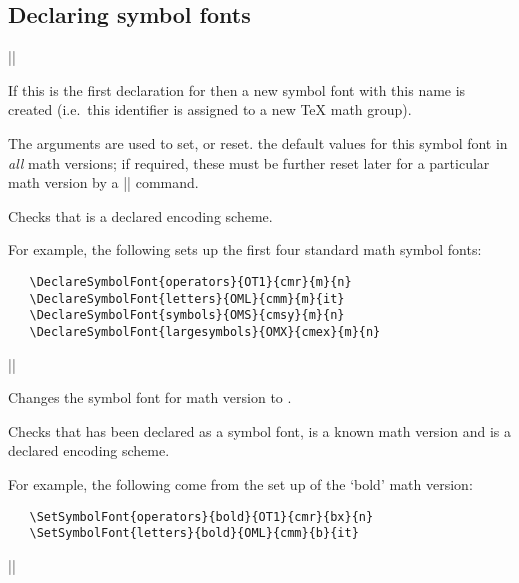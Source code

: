 \documentclass{ltxguide}[1995/11/28]
\begin{document}
 
\subsection{Declaring symbol fonts}
\label{sec:symalph}
 
\begin{decl}
|\DeclareSymbolFont|   
                      
\end{decl}
 
If this is the first declaration for  then a new
symbol font with this name is created (i.e.~this identifier is assigned
to a new \TeX{} math group).
 
The arguments     are used to
set, or reset. the default values for this symbol font in \emph{all}
math versions; if required, these must be further reset later for
a particular math version by a |\SetSymbolFont| command.
 
Checks that  is a declared encoding scheme.
 
 
For example, the following sets up the first four standard math symbol
fonts:
\begin{verbatim}
   \DeclareSymbolFont{operators}{OT1}{cmr}{m}{n}
   \DeclareSymbolFont{letters}{OML}{cmm}{m}{it}
   \DeclareSymbolFont{symbols}{OMS}{cmsy}{m}{n}
   \DeclareSymbolFont{largesymbols}{OMX}{cmex}{m}{n}
\end{verbatim}
 
 
\begin{decl}
|\SetSymbolFont|  \\
     \null\hfill {}   
\end{decl}
 
Changes the symbol font  for math version 
to    .
 
Checks that  has been declared as a symbol font,  
 is a known math version and  is a
declared encoding scheme.
 

For example, the following come from the set up of the `bold'
math version:
\begin{verbatim}
   \SetSymbolFont{operators}{bold}{OT1}{cmr}{bx}{n}
   \SetSymbolFont{letters}{bold}{OML}{cmm}{b}{it}
\end{verbatim}
 
 
\begin{decl}
|\DeclareSymbolFontAlphabet|  
\end{decl}
 
\end{document}

